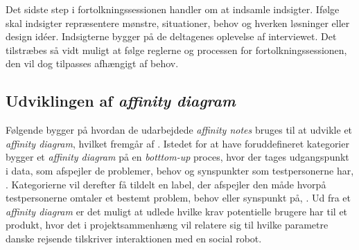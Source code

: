 Det sidste step i fortolkningssessionen handler om at indsamle indsigter. Ifølge \textcite[s. 119]{Book:CIInterpretationSession} skal indsigter repræsentere mønstre, situationer, behov og hverken løsninger eller design idéer. Indsigterne bygger på de deltagenes oplevelse af interviewet. \blankline
%
Det tilstræbes så vidt muligt at følge reglerne og processen for fortolkningssessionen, den vil dog tilpasses afhængigt af behov. 

\subsection{Udviklingen af \textit{affinity diagram}}
\label{ParametreUdviklingAfAffinity}
% 
Følgende bygger på hvordan de udarbejdede \textit{affinity notes} bruges til at udvikle et \textit{affinity diagram}, hvilket fremgår af \textcite[ss. 159-179]{Book:BuildingAnAffinity}. Istedet for at have foruddefineret kategorier bygger et \textit{affinity diagram} på en \textit{botttom-up} proces, hvor der tages udgangspunkt i data, som afspejler de problemer, behov og synspunkter som testpersonerne har, \parencite[s. 159]{Book:BuildingAnAffinity}. Kategorierne vil derefter få tildelt en label, der afspejler den måde hvorpå testpersonerne omtaler et bestemt problem, behov eller synspunkt på, \parencite[s. 159]{Book:BuildingAnAffinity}. Ud fra et \textit{affinity diagram} er det muligt at udlede hvilke krav potentielle brugere har til et produkt, hvor det i projektsammenhæng vil relatere sig til hvilke parametre danske rejsende tilskriver interaktionen med en social robot. 

